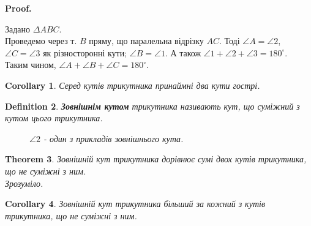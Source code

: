 \documentclass[a4paper, 10pt]{article}
\makeatletter
\def\qed{$\blacksquare$}
\theoremstyle{theoremdd}
\newtheorem{theorem}{Theorem}[subsection]
\theoremstyle{theoremdd}
\theoremstyle{theoremdd}
\newtheorem{definition}[theorem]{Definition}
\theoremstyle{theoremdd}
\theoremstyle{theoremdd}
\theoremstyle{theoremdd}
\theoremstyle{theoremdd}
\theoremstyle{theoremdd}
\theoremstyle{theoremdd}
\newtheorem{corollary}[theorem]{Corollary}
\renewenvironment{proof}[1][Proof.\\]{\par
\pushQED{\hfill \qed}%
\normalfont \topsep6\p@\@plus6\p@\relax
\trivlist
\item\relax
{\bfseries
#1\@addpunct{.}}\hspace\labelsep\ignorespaces
}{%
\popQED\endtrivlist\@endpefalse
}
\makeatother
\begin{document}
\begin{proof}
Задано $\Delta ABC$.\\
Проведемо через т. $B$ пряму, що паралельна відрізку $AC$. Тоді $\angle A = \angle 2$, $\angle C = \angle 3$ як різносторонні кути; $\angle B = \angle 1$. А також $\angle 1 + \angle 2 + \angle 3 = 180^\circ$.\\
Таким чином, $\angle A + \angle B + \angle C = 180^\circ$.
\begin{figure}[H]
\centering
{}
\end{figure}
\end{proof}

\begin{corollary}
Серед кутів трикутника принаймні два кути гострі.
\end{corollary}

\begin{definition}
\textbf{Зовнішнім кутом} трикутника називають кут, що суміжний з кутом цього трикутника.
\begin{figure}[H]
\centering
{}
\caption*{$\angle 2$ - один з прикладів зовнішнього кута.}
\end{figure}
\end{definition}

\begin{theorem}
Зовнішній кут трикутника дорівнює сумі двох кутів трикутника, що не суміжні з ним.\\
\textit{Зрозуміло.}
\end{theorem}

\begin{corollary}
Зовнішній кут трикутника більший за кожний з кутів трикутника, що не суміжні з ним.
\end{corollary}
\end{document}

